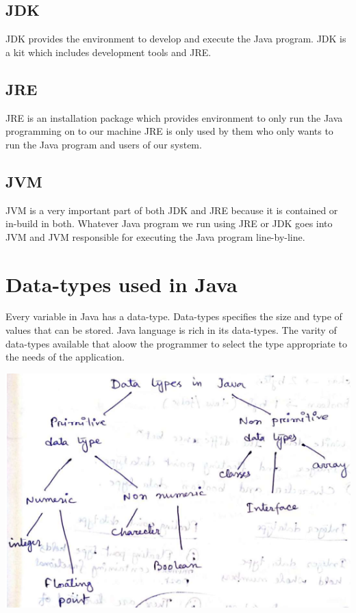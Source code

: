 \documentclass[11pt, a4paper]{book}
\begin{document}
    \subsection{JDK}
      JDK provides the environment to develop and execute the Java program. JDK is a kit which includes development tools and JRE.
  
    \subsection{JRE}
      JRE is an installation package which provides environment to only run the Java programming on to our machine JRE is only used by them who only wants to run the Java program and users of our system.
  
    \subsection{JVM}
      JVM is a very important part of both JDK and JRE because it is contained or in-build in both. Whatever Java program we run using JRE or JDK goes into JVM and JVM responsible for executing the Java program line-by-line.
  
    \section{Data-types used in Java}
      Every variable in Java has a data-type. Data-types specifies the size and type of values that can be stored. Java language is rich in its data-types. The varity of data-types available that aloow the programmer to select the type appropriate to the needs of the application.
  
      \includegraphics{pdatatypesJava}
  
\end{document}
